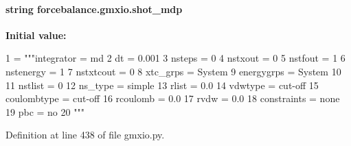 \hypertarget{namespaceforcebalance_1_1gmxio_a35d747dea4a5446d049d901e782feaa2}{
\paragraph[{shot\-\_\-mdp}]{\setlength{\rightskip}{0pt plus 5cm}string forcebalance.\-gmxio.\-shot\-\_\-mdp}}\label{namespaceforcebalance_1_1gmxio_a35d747dea4a5446d049d901e782feaa2}
{\bfseries Initial value\-:}
\begin{DoxyCode}
1 = \textcolor{stringliteral}{"""integrator = md}
2 \textcolor{stringliteral}{dt              = 0.001}
3 \textcolor{stringliteral}{nsteps          = 0}
4 \textcolor{stringliteral}{nstxout         = 0}
5 \textcolor{stringliteral}{nstfout         = 1}
6 \textcolor{stringliteral}{nstenergy       = 1}
7 \textcolor{stringliteral}{nstxtcout       = 0}
8 \textcolor{stringliteral}{xtc\_grps        = System}
9 \textcolor{stringliteral}{energygrps      = System}
10 \textcolor{stringliteral}{}
11 \textcolor{stringliteral}{nstlist         = 0}
12 \textcolor{stringliteral}{ns\_type         = simple}
13 \textcolor{stringliteral}{rlist           = 0.0}
14 \textcolor{stringliteral}{vdwtype         = cut-off}
15 \textcolor{stringliteral}{coulombtype     = cut-off}
16 \textcolor{stringliteral}{rcoulomb        = 0.0}
17 \textcolor{stringliteral}{rvdw            = 0.0}
18 \textcolor{stringliteral}{constraints     = none}
19 \textcolor{stringliteral}{pbc             = no}
20 \textcolor{stringliteral}{"""}
\end{DoxyCode}


Definition at line 438 of file gmxio.\-py.


